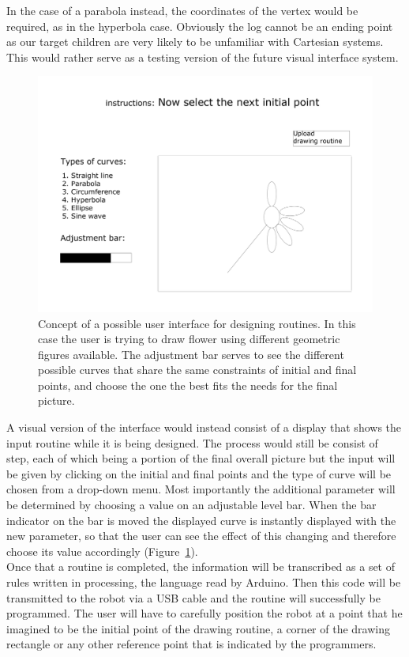     In the case of a parabola instead, the coordinates of the vertex would be required, as in the hyperbola case. Obviously the log cannot be an ending point as our target children are very likely to be unfamiliar with Cartesian systems. This would rather serve as a testing version of the future visual interface system.

    \begin{figure}
        \centering
        \includegraphics[width=\textwidth]{Files/visual_interface_concept}
        \caption{Concept of a possible user interface for designing routines. In this case the user is trying to draw flower using different geometric figures available. The adjustment bar serves to see the different possible curves that share the same constraints of initial and final points, and choose the one the best fits the needs for the final picture.}
        \label{fig:visual interface concept}
    \end{figure}

    A visual version of the interface would instead consist of a display that shows the input routine while it is being designed. The process would still be consist of step, each of which being a portion of the final overall picture but the input will be given by clicking on the initial and final points and the type of curve will be chosen from a drop-down menu. Most importantly the additional parameter will be determined by choosing a value on an adjustable level bar. When the bar indicator on the bar is moved the displayed curve is instantly displayed with the new parameter, so that the user can see the effect of this changing and therefore choose its value accordingly (Figure~\ref{fig:visual interface concept}).\\
    Once that a routine is completed, the information will be transcribed as a set of rules written in processing, the language read by \gls{Arduino}. Then this code will be transmitted to the robot via a USB cable and the routine will successfully be programmed. The user will have to carefully position the robot at a point that he imagined to be the initial point of the drawing routine, a corner of the drawing rectangle or any other reference point that is indicated by the programmers.

